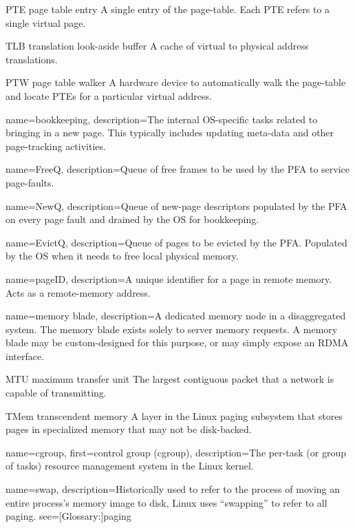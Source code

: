   {PTE}
  {page table entry}
  {A single entry of the page-table. Each PTE refers to a single
  virtual page.}

  {TLB}
  {translation look-aside buffer}
  {A cache of virtual to physical address translations.}

  {PTW}
  {page table walker}
  {A hardware device to automatically walk the page-table and
  locate PTEs for a particular virtual address.}

{
  name={bookkeeping},
  description={The internal OS-specific tasks related to bringing in a new
page. This typically includes updating meta-data and other page-tracking
activities.}
}

{
  name={FreeQ},
  description={Queue of free frames to be used by the PFA to service
page-faults.}
}

{
  name={NewQ},
  description={Queue of new-page descriptors populated by the PFA on every page
fault and drained by the OS for bookkeeping.}
}

{
  name={EvictQ},
  description={Queue of pages to be evicted by the PFA. Populated by the OS
when it needs to free local physical memory.}
}

{
  name={pageID},
  description={A unique identifier for a page in remote memory. Acts as a
remote-memory address.}
}

{
  name={memory blade},
  description={A dedicated memory node in a disaggregated system. The memory blade
exists solely to server memory requests. A memory blade may be custom-designed
for this purpose, or may simply expose an RDMA interface.}
}

  {MTU}
  {maximum transfer unit}
  {The largest contiguous packet that a network is capable of
  transmitting.}

  {TMem}
  {transcendent memory}
  {A layer in the Linux paging subsystem that stores pages in
  specialized memory that may not be disk-backed.}

{
  name={cgroup},
  first={control group (cgroup)},
  description={The per-task (or group of tasks) resource management system in
the Linux kernel.}
}

{
  name={swap},
  description={Historically used to refer to the process of moving an entire
process's memory image to disk, Linux uses ``swapping'' to refer to all
paging.}
  see=[Glossary:]{paging}
}


